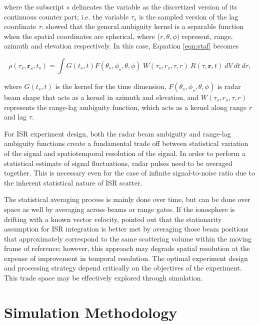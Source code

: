 \documentclass[draft,ras]{agutex}
\begin{document}
\begin{article}
\noindent where the subscript $s$ delineates the variable as the discretized version of its continuous counter part; i.e. the variable $\tau_s$ is the sampled version of the lag coordinate $\tau$. \citet{RDS:RDS20236} showed that the general ambiguity kernel is a separable function when the spatial coordinates are spherical, where ($r,\theta,\phi)$ represent, range, azimuth and elevation respectively.  In this case, Equation \ref{eqn:staf} becomes

\begin{equation}
\label{eqn:stafbrok}
\rho(\tau_s,\mathbf{r}_s,t_s)= \int G(t_s,t)F(\theta_s,\phi_s,\theta,\phi)\:W(\tau_s,r_s,\tau,r)\:R(\tau,\mathbf{r},t)\ dV\ dt\ d\tau,
\end{equation}

\noindent where $G(t_s,t)$ is the kernel for the time dimension, $F(\theta_s,\phi_s,\theta,\phi)$ is radar beam shape that acts as a kernel in azimuth and elevation, and $W(\tau_s,r_s,\tau,r) $ represents the range-lag ambiguity function, which acts as a kernel along range $r$ and lag $\tau$. 

For ISR experiment design, both the radar beam ambiguity and range-lag ambiguity functions create a fundamental trade off between statistical variation of the signal and spatiotemporal resolution of the signal. In order to  perform a statistical estimate of signal fluctuations, radar pulses need to be averaged together. This is necessary even for the case of infinite signal-to-noise ratio due to the inherent statistical nature of ISR  scatter.

The statistical averaging process is mainly done over time, but can be done over space as well by averaging across beams or range gates. If the ionosphere is drifting with a known vector velocity, \citet{RDS:RDS20236} pointed out that the stationarity assumption for ISR integration is  better met by averaging those beam positions that approximately correspond to the same scattering volume within the moving frame of reference; however, this approach may degrade spatial resolution at the expense of improvement in temporal resolution.  The optimal experiment design and processing strategy depend critically on the objectives of the experiment.   This trade space may be effectively explored through simulation.

\section{Simulation Methodology}


\end{article}
\end{document}
